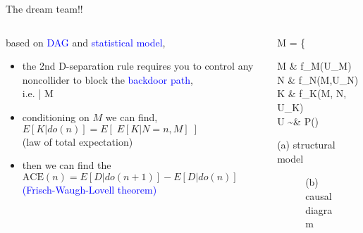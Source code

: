 \begin{frame}
	{The dream team!!}
	\begin{columns}
		\begin{column}{0.5\textwidth}
			based on \textcolor{blue}{DAG} and \textcolor{blue}{statistical model},
			\begin{itemize}
				\item the 2nd D-separation rule requires you to control any noncollider to block the \textcolor{blue}{backdoor path}, \\
				i.e.  \; | M \\
				\item conditioning on $M$ we can find, \\
				{\small $E[K | do(n)] = E[\; E[K | N=n, M] \;]$} \\
				{\small (law of total expectation)}
				\item then we can find the \\
				{\small $\text{ACE}(n) = E[D | do(n+1)] - E[D | do(n)]$ } \\
				{\small \textcolor{blue}{(Frisch-Waugh-Lovell theorem)} }
			\end{itemize}
		\end{column}
		\begin{column}{0.5\textwidth}  
			\begin{equ}
				M = \left\{ \begin{aligned} 
					M \leftarrow & \; f_{M}(U_{M}) \\
					N \leftarrow & \; f_{N}(M,U_{N}) \\
					K \leftarrow & \; f_{K}(M, N, U_{K}) \\
					U \sim & \; P()
				\end{aligned} \right
				\caption*{(a) structural model}
			\end{equ}
			\begin{figure}
				\caption*{(b) causal diagram}
			\end{figure}
		\end{column}
	\end{columns}
\end{frame}
